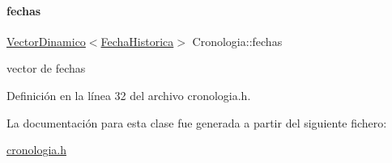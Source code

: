 \paragraph{\texorpdfstring{fechas}{fechas}}
{\footnotesize\ttfamily \hyperlink{classVectorDinamico}{Vector\+Dinamico}$<$\hyperlink{classFechaHistorica}{Fecha\+Historica}$>$ Cronologia\+::fechas\hspace{0.3cm}{\ttfamily [private]}}

vector de fechas 

Definición en la línea 32 del archivo cronologia.\+h.



La documentación para esta clase fue generada a partir del siguiente fichero\+:\begin{DoxyCompactItemize}
\item 
\hyperlink{cronologia_8h}{cronologia.\+h}\end{DoxyCompactItemize}
